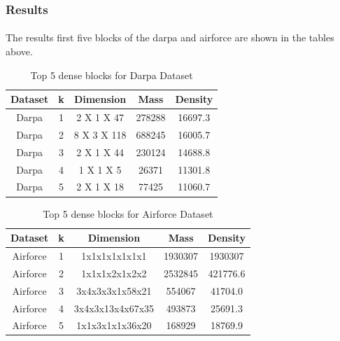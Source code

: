 \subsubsection{Results}
\paragraph{} The results first five blocks of the darpa and airforce are shown in the tables above.
\begin{table}
\centering
\begin{tabular}{|c|c|c|c|c|}
    \hline
        Dataset & k & Dimension & Mass & Density \\
    \hline
        Darpa & 1 & 2 X 1 X 47 & 278288 & 16697.3 \\
    \hline
        Darpa & 2 & 8 X 3 X 118 & 688245 & 16005.7 \\
    \hline
        Darpa & 3 & 2 X 1 X 44 & 230124 & 14688.8 \\
    \hline
        Darpa & 4 & 1 X 1 X 5 & 26371 & 11301.8 \\
    \hline
        Darpa & 5 & 2 X 1 X 18 & 77425 & 11060.7 \\
    \hline
\end{tabular}
\caption {Top 5 dense blocks for Darpa Dataset}
\end{table}

\begin{table}
\centering
\begin{tabular}{|c|c|c|c|c|}
    \hline
        Dataset & k & Dimension & Mass & Density \\
    \hline
        Airforce & 1 & 1x1x1x1x1x1x1 & 1930307 & 1930307 \\
    \hline
        Airforce & 2 & 1x1x1x2x1x2x2 & 2532845 & 421776.6 \\
    \hline
        Airforce & 3 & 3x4x3x3x1x58x21 & 554067 & 41704.0\\
    \hline
        Airforce & 4 & 3x4x3x13x4x67x35 & 493873 & 25691.3 \\
    \hline
        Airforce & 5 & 1x1x3x1x1x36x20 & 168929 & 18769.9 \\
    \hline
\end{tabular}
\caption {Top 5 dense blocks for Airforce Dataset}
\end{table}

